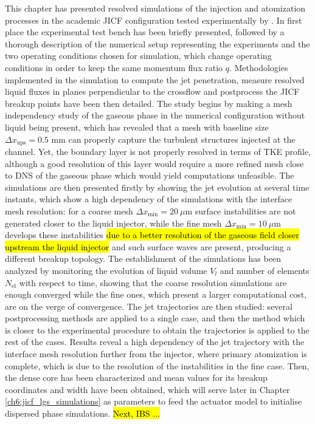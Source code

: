 This chapter has presented resolved simulations of the injection and atomization processes in the academic JICF configuration tested experimentally by . In first place the experimental test bench has been briefly presented, followed by a thorough description of the numerical setup representing the experiments and the two operating conditions chosen for simulation, which change operating conditions in order to keep the same momentum flux ratio $q$. Methodologies implemented in the simulation to compute the jet penetration, measure resolved liquid fluxes in planes perpendicular to the crossflow and postprocess the JICF breakup points have been then detailed. The study begins by making a mesh independency study of the gaseous phase in the numerical configuration without liquid being present, which has revealed that a mesh with baseline size $\Delta x_\mathrm{ups} = 0.5$ mm can properly capture the turbulent structures injected at the channel. Yet, the boundary layer is not properly resolved in terms of TKE profile, although a good resolution of this layer would require a more refined mesh close to DNS of the gaseous phase which would yield computations unfeasible. The simulations are then presented firstly by showing the jet evolution at several time instants, which show a high dependency of the simulations with the interface mesh resolution: for a coarse mesh $\Delta x_\mathrm{min} = 20~\mu$m surface instabilities are not generated closer to the liquid injector, while the fine mesh $\Delta x_\mathrm{min} = 10~\mu$m develops these instabilities \hl{due to a better resolution of the gaseous field closer upstream the liquid injector} and such surface waves are present, producing a different breakup topology. The establishment of the simulations has been analyzed by monitoring the evolution of liquid volume $V_l$ and number of elements $N_\mathrm{el}$ with respect to time, showing that the coarse resolution simulations are enough converged while the fine ones, which present a larger computational cost, are on the verge of convergence. The jet trajectories are then studied: several postprocessing methods are applied to a single case, and then the method which is closer to the experimental procedure to obtain the trajectories is applied to the rest of the cases. Results reveal a high dependency of the jet trajectory with the interface mesh resolution further from the injector, where primary atomization is complete, which is due to the resolution of the instabilities in the fine case. Then, the dense core has been characterized and mean values for its breakup coordinates and width have been obtained, which will serve later in Chapter \ref{ch6:jicf_lgs_simulations} as parameters to feed the actuator model to initialise dispersed phase simulations. \hl{Next, IBS ...}


